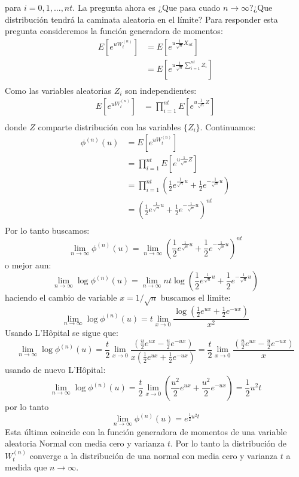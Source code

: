 \documentclass{extreport}
\theoremstyle{definicion}
\theoremstyle{propiedad}
\theoremstyle{teorema}
\begin{document}
para $i=0,1,\ldots, nt$. La pregunta ahora es ¿Que pasa cuado $n\rightarrow\infty$?¿Que distribución tendrá la caminata aleatoria en el límite? Para responder esta pregunta consideremos la función generadora de momentos:
\begin{align*}
    E\left[e^{uW_{t}^{(n)}}\right] & = E\left[e^{u\frac{1}{\sqrt{n}}X_{nt}}\right]\\
                                   & = E\left[e^{u\frac{1}{\sqrt{n}}\sum_{i=1}^{nt}Z_i}\right]\\
\end{align*}
Como las variables aleatorias $Z_i$ son independientes: 
\begin{align*}
    E\left[e^{uW_{t}^{(n)}}\right] & = \prod_{i= 1}^{nt}E\left[e^{u\frac{1}{\sqrt{n}}Z}\right]\\
\end{align*}
donde $Z$ comparte distribución con las variables $\{Z_i\}$. Continuamos:
\begin{align*}
                                  \phi^{(n)}(u) & = E\left[e^{uW_{t}^{(n)}}\right] \\
                                   & = \prod_{i= 1}^{nt}E\left[e^{u\frac{1}{\sqrt{n}}Z}\right]\\
                                   & = \prod_{i=1}^{nt}\left(\frac{1}{2}e^{\frac{1}{\sqrt{n}}u} + \frac{1}{2}e^{-\frac{1}{\sqrt{n}}u}\right) \\
                                   & = \left(\frac{1}{2}e^{\frac{1}{\sqrt{n}}u} + \frac{1}{2}e^{-\frac{1}{\sqrt{n}}u}\right)^{nt} \\
\end{align*}
Por lo tanto buscamos:
$$
\lim_{n\rightarrow\infty}\phi^{(n)}(u) = \lim_{n\rightarrow\infty}\left(\frac{1}{2}e^{\frac{1}{\sqrt{n}}u} + \frac{1}{2}e^{-\frac{1}{\sqrt{n}}u}\right)^{nt}
$$
o mejor aun:
$$
\lim_{n\rightarrow\infty}\log\phi^{(n)}(u) = \lim_{n\rightarrow\infty}nt\log\left(\frac{1}{2}e^{\frac{1}{\sqrt{n}}u} + \frac{1}{2}e^{-\frac{1}{\sqrt{n}}u}\right)
$$
haciendo el cambio de variable $x = 1/\sqrt{n}$ buscamos el limite:
$$
\lim_{n\rightarrow\infty}\log\phi^{(n)}(u) = t\lim_{x\rightarrow 0}\frac{\log\left(\frac{1}{2}e^{ux} + \frac{1}{2}e^{-ux}\right)}{x^2}
$$
Usando L'Hôpital se sigue que:
$$
\lim_{n\rightarrow\infty}\log\phi^{(n)}(u) = \frac{t}{2}\lim_{x\rightarrow 0}\frac{\left(\frac{u}{2}e^{ux} - \frac{u}{2}e^{-ux}\right)}{x\left(\frac{1}{2}e^{ux} + \frac{1}{2}e^{-ux}\right)} = \frac{t}{2}\lim_{x\rightarrow 0}\frac{\left(\frac{u}{2}e^{ux} - \frac{u}{2}e^{-ux}\right)}{x}
$$
usando de nuevo L'Hôpital:
$$
\lim_{n\rightarrow\infty}\log\phi^{(n)}(u)  = \frac{t}{2}\lim_{x\rightarrow 0}\left(\frac{u^2}{2}e^{ux} + \frac{u^2}{2}e^{-ux}\right) = \frac{1}{2}u^2t
$$
por lo tanto
$$
\lim_{n\rightarrow\infty}\phi^{(n)}(u)  = e^{\frac{1}{2}u^2t}
$$
Esta última coincide con la función generadora de momentos de una variable aleatoria Normal con media cero y varianza $t$. Por lo tanto la distribución de $W_t^{(n)}$ converge a la distribución de una normal con media cero y varianza $t$ a medida que $n\rightarrow\infty$.
\end{document}
